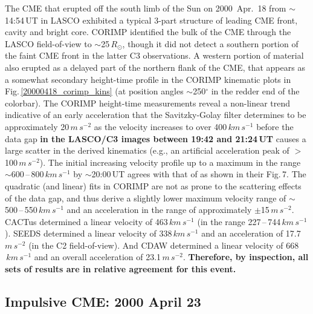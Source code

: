 \documentclass[referee,a4paper,12pt,traditabstract]{swsc}
\begin{document}
\begin{linenumbers}
The CME that erupted off the south limb of the Sun on 2000~Apr.~18 from $\sim$14:54\,UT in LASCO exhibited a typical 3-part structure of leading CME front, cavity and bright core. CORIMP identified the bulk of the CME through the LASCO field-of-view to $\sim$25\,$R_\odot$, though it did not detect a southern portion of the faint CME front in the latter C3 observations. A western portion of material also erupted as a delayed part of the northern flank of the CME, that appears as a somewhat secondary height-time profile in the CORIMP kinematic plots in Fig.\,\ref{20000418_corimp_kins} (at position angles $\sim$250$^{\circ}$ in the redder end of the colorbar). The CORIMP height-time measurements reveal a non-linear trend indicative of an early acceleration that the Savitzky-Golay filter determines to be approximately 20\,$m\,s^{-2}$ as the velocity increases to over 400\,$km\,s^{-1}$ before the data gap {\bf in the LASCO/C3 images between 19:42 and 21:24\,UT} causes a large scatter in the derived kinematics (e.g., an artificial acceleration peak of $>$100\,$m\,s^{-2}$). The initial increasing velocity profile up to a maximum in the range $\sim$600\,--\,800\,$km\,s^{-1}$ by $\sim$20:00\,UT agrees with that of \cite{2009A&A...495..325B} as shown in their Fig.\,7. The quadratic (and linear) fits in CORIMP are not as prone to the scattering effects of the data gap, and thus derive a slightly lower maximum velocity range of $\sim$500\,--\,550\,$km\,s^{-1}$ and an acceleration in the range of approximately $\pm$15\,$m\,s^{-2}$. CACTus determined a linear velocity of 463$\,km\,s^{-1}$ (in the range 227\,--\,744\,$km\,s^{-1}$). SEEDS determined a linear velocity of 338$\,km\,s^{-1}$ and an acceleration of 17.7\,$m\,s^{-2}$ (in the C2 field-of-view). And CDAW determined a linear velocity of 668$\,km\,s^{-1}$ and an overall acceleration of 23.1\,$m\,s^{-2}$. {\bf Therefore, by inspection, all sets of results are in relative agreement for this event.}


\subsection{Impulsive CME: 2000 April 23}



\end{linenumbers}
\end{document}
